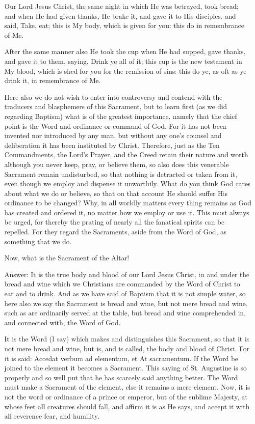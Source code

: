 Our Lord Jesus Christ, the same night in which He was betrayed, took
bread; and when He had given thanks, He brake it, and gave it to His
disciples, and said, Take, eat; this is My body, which is given for
you:
this do in remembrance of Me.

After the same manner also He took the cup when He had supped, gave
thanks, and gave it to them, saying, Drink ye all of it; this cup is
the new testament in My blood, which is shed for you for the remission
of sins: this do ye, as oft as ye drink it, in remembrance of Me.

Here also we do not wish to enter into controversy and contend with the
traducers and blasphemers of this Sacrament, but to learn first (as we
did regarding Baptism) what is of the greatest importance, namely that
the chief point is the Word and ordinance or command of God. For it has
not been invented nor introduced by any man, but without any one's
counsel and deliberation it has been instituted by Christ. Therefore,
just as the Ten Commandments, the Lord's Prayer, and the Creed retain
their nature and worth although you never keep, pray, or believe them,
so also does this venerable Sacrament remain undisturbed, so that
nothing is detracted or taken from it, even though we employ and
dispense it unworthily. What do you think God cares about what we do or
believe, so that on that account He should suffer His ordinance to be
changed? Why, in all worldly matters every thing remains as God has
created and ordered it, no matter how we employ or use it. This must
always be urged, for thereby the prating of nearly all the fanatical
spirits can be repelled. For they regard the Sacraments, aside from the
Word of God, as something that we do.

Now, what is the Sacrament of the Altar!

Answer: It is the true body and blood of our Lord Jesus Christ, in and
under the bread and wine which we Christians are commanded by the Word
of Christ to eat and to drink. And as we have said of Baptism that it
is not simple water, so here also we say the Sacrament is bread and
wine, but not mere bread and wine, such as are ordinarily served at the
table, but bread and wine comprehended in, and connected with, the Word
of God.

It is the Word (I say) which makes and distinguishes this Sacrament, so
that it is not mere bread and wine, but is, and is called, the body and
blood of Christ. For it is said: Accedat verbum ad elementum, et At
sacramentum. If the Word be joined to the element it becomes a
Sacrament. This saying of St. Augustine is so properly and so well put
that he has scarcely said anything better. The Word must make a
Sacrament of the element, else it remains a mere element. Now, it is
not the word or ordinance of a prince or emperor, but of the sublime
Majesty, at whose feet all creatures should fall, and affirm it is as
He says, and accept it with all reverence fear, and humility.

